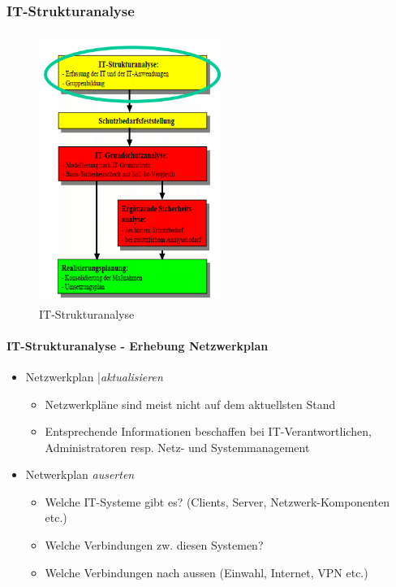 \documentclass[10pt,a4paper]{article}
\begin{document}
\subsubsection*{IT-Strukturanalyse}
\begin{figure}[H]
    \begin{center}
    \includegraphics[width=6cm]{images/Strukturanalyse.png}
    \caption{IT-Strukturanalyse}
    \label{IT-Strukturanalyse}
    \end{center}
\end{figure}

\paragraph*{IT-Strukturanalyse - Erhebung Netzwerkplan}

\begin{itemize}[noitemsep,topsep=0pt,leftmargin=*]
    \item Netzwerkplan |\textsl{aktualisieren}
    \begin{itemize}[noitemsep,topsep=0pt,leftmargin=*]
        \item Netzwerkpläne sind meist nicht auf dem
        aktuellsten Stand
        \item Entsprechende Informationen beschaffen bei
        IT-Verantwortlichen, Administratoren resp.
        Netz- und Systemmanagement
    \end{itemize}
    \item Netwerkplan \textsl{auserten}
    \begin{itemize}[noitemsep,topsep=0pt,leftmargin=*]
        \item  Welche IT-Systeme gibt es? (Clients, Server,
        Netzwerk-Komponenten etc.)
        \item Welche Verbindungen zw. diesen Systemen?
        \item Welche Verbindungen nach aussen (Einwahl,
        Internet, VPN etc.)
    \end{itemize}
\end{itemize}
\end{document}
